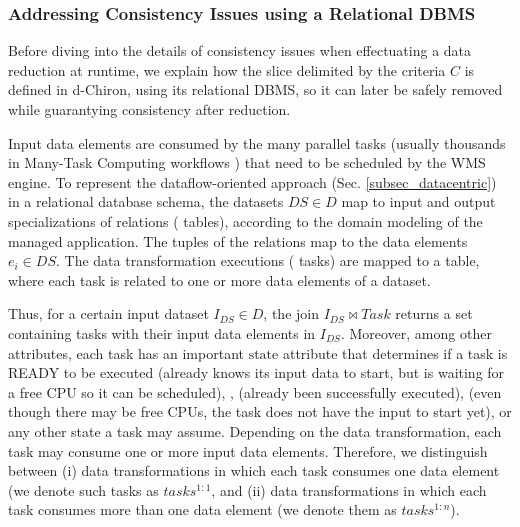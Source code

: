 \subsubsection{Addressing Consistency Issues using a Relational DBMS}

Before diving into the details of consistency issues when effectuating a data reduction at runtime, we explain how the slice delimited by the criteria $C$ is defined in
d-Chiron, using its relational DBMS, so it can later be safely removed
while guarantying consistency after reduction.

Input data elements are
consumed by the many parallel tasks (usually thousands in Many-Task
Computing workflows  \cite{Raicu2008Many-task}) that need to be scheduled by the WMS
engine. To represent the
dataflow-oriented approach (Sec. \ref{subsec_datacentric})
in a relational database schema, the
datasets $DS \in D$ map to input and output specializations of  relations (\ie{} tables), according to the domain modeling of the managed application. The tuples of the  relations map to the data elements $e_i \in DS$. The data transformation executions (\ie{} tasks) are mapped to a  table,
where each task is related to one or more data elements of a dataset.

Thus, for a certain
input dataset $I_{DS} \in D$, the join $I_{DS} \bowtie Task$ returns
a set containing tasks with their input data elements in $I_{DS}$.
Moreover, among other attributes, each task has an important
\(\text{state}\) attribute that determines if a task is READY to be
executed (already knows its input data to start, but is waiting for a
free CPU so it can be scheduled), ,  (already been
successfully executed),  (even though there may be free CPUs, the
task does not have the input to start yet), or any other state a task
may assume.
Depending on the data transformation, each task may consume one or more input data elements.
Therefore, we distinguish between
(i) data transformations in which each task consumes one data element (we denote
such tasks as $tasks^{1:1}$, and (ii) data transformations in which each
task consumes more than one data element (we denote them as
$tasks^{1:n}$).

